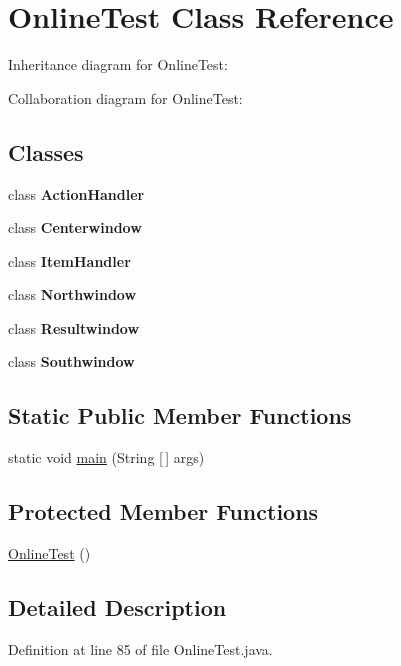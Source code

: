 \hypertarget{class_online_test}{}\section{Online\+Test Class Reference}
\label{class_online_test}


Inheritance diagram for Online\+Test\+:


Collaboration diagram for Online\+Test\+:
\subsection*{Classes}
\begin{DoxyCompactItemize}
\item 
class {\bfseries Action\+Handler}
\item 
class {\bfseries Centerwindow}
\item 
class {\bfseries Item\+Handler}
\item 
class {\bfseries Northwindow}
\item 
class {\bfseries Resultwindow}
\item 
class {\bfseries Southwindow}
\end{DoxyCompactItemize}
\subsection*{Static Public Member Functions}
\begin{DoxyCompactItemize}
\item 
static void \mbox{\hyperlink{class_online_test_a9a7715720700f7fb5693592dbca1f759}{main}} (String \mbox{[}$\,$\mbox{]} args)
\end{DoxyCompactItemize}
\subsection*{Protected Member Functions}
\begin{DoxyCompactItemize}
\item 
\mbox{\hyperlink{class_online_test_aa142859790bd63baf85669ab1417a275}{Online\+Test}} ()
\end{DoxyCompactItemize}


\subsection{Detailed Description}


Definition at line 85 of file Online\+Test.\+java.



